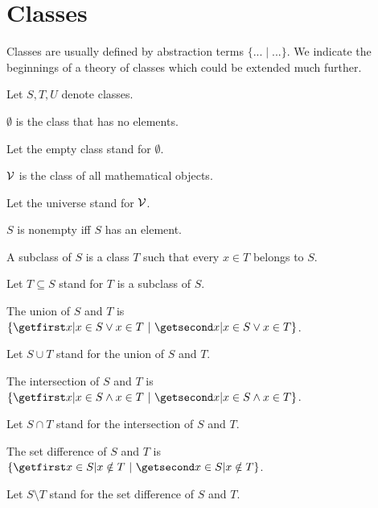 \documentclass{article}
\begin{document}
\section{Classes}

Classes are usually defined by
abstraction terms $\{ ... \mid ... \}$. We indicate the
beginnings of a theory of classes which could be extended
much further.

\begin{forthel}
Let $S, T, U$ denote classes.

\begin{definition}
$\emptyset$ is the class that has no elements.
\end{definition}

Let the empty class stand for $\emptyset$.

\begin{definition}
${\cal V}$ is the class of all mathematical objects.
\end{definition}

Let the universe stand for ${\cal V}$.



\begin{definition}
$S$ is nonempty iff $S$ has an element.
\end{definition}

  \begin{definition}
    A subclass of $S$ is a class $T$ such that every $x \in T$ belongs to $S$.
  \end{definition}

  Let $T \subseteq S$ stand for $T$ is a subclass of $S$.

  \begin{definition}
    The union of $S$ and $T$ is $\class{x | x \in S \vee x \in T}$.
  \end{definition}

  Let $S \cup T$ stand for the union of $S$ and $T$.

  \begin{definition}
    The intersection of $S$ and $T$ is 
      $\class{x | x \in S \wedge x \in T}$.
  \end{definition}

  Let $S \cap T$ stand for the intersection of $S$ and $T$.

  \begin{definition}
    The set difference of $S$ and $T$ is $\class{x \in S | x \notin T}$.
  \end{definition}

  Let $S \setminus T$ stand for the set difference of $S$ and $T$.
\end{forthel}
\end{document}
